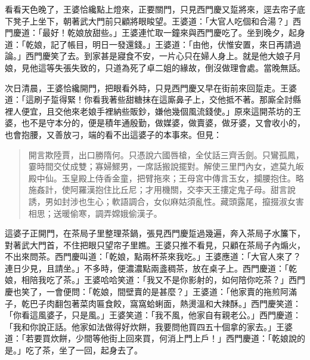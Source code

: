 看看天色晚了，王婆恰纔點上燈來，正要關門，只見西門慶又踅將來，逕去帘子底下凳子上坐下，朝著武大門前只顧將眼睃望。王婆道：「大官人吃個和合湯？」西門慶道：「最好！乾娘放甜些。」王婆連忙取一鐘來與西門慶吃了。坐到晚夕，起身道：「乾娘，記了帳目，明日一發還錢。」王婆道：「由他，伏惟安置，來日再請過論。」西門慶笑了去。到家甚是寢食不安，一片心只在婦人身上。就是他大娘子月娘，見他這等失張失致的，只道為死了卓二姐的緣故，倒沒做理會處。當晚無話。

次日清晨，王婆恰纔開門，把眼看外時，只見西門慶又早在街前來回踅走。王婆道：「這刷子踅得緊！你看我著些甜糖抹在這廝鼻子上，交他抵不著。那廝全討縣裡人便宜，且交他來老娘手裡納些販鈔，嫌他幾個風流錢使。」原來這開茶坊的王婆，也不是守本分的，便是積年通殷勤，做媒婆，做賣婆，做牙婆，又會收小的，也會抱腰，又善放刁，端的看不出這婆子的本事來。但見：
\begin{quote}
開言欺陸賈，出口勝隋何。只憑說六國唇槍，全仗話三齊舌劍。只鸞孤鳳，霎時間交仗成雙；寡婦鰥男，一席話搬說擺對。解使三里門內女，遮莫九皈殿中仙。玉皇殿上侍香金童，把臂拖來；王母宮中傳言玉女，攔腰抱住。略施姦計，使阿羅漢抱住比丘尼；才用機關，交李天王摟定鬼子母。甜言說誘，男如封涉也生心；軟語調合，女似麻姑須亂性。藏頭露尾，攛掇淑女害相思；送暖偷寒，調弄嫦娥偷漢子。
\end{quote}

這婆子正開門，在茶局子里整理茶鍋，張見西門慶踅過幾遍，奔入茶局子水簾下，對著武大門首，不住把眼只望帘子里瞧。王婆只推不看見，只顧在茶局子內煽火，不出來問茶。西門慶叫道：「乾娘，點兩杯茶來我吃。」王婆應道：「大官人來了？連日少見，且請坐。」不多時，便濃濃點兩盞稠茶，放在桌子上。西門慶道：「乾娘，相陪我吃了茶。」王婆哈哈笑道：「我又不是你影射的，如何陪你吃茶？」西門慶也笑了，一會便問：「乾娘，間壁賣的是甚麼？」王婆道：「他家賣的拖煎阿滿子，乾巴子肉翻包著菜肉匾食餃，窩窩蛤蜊面，熱燙溫和大辣酥。」西門慶笑道：「你看這風婆子，只是風。」王婆笑道：「我不風，他家自有親老公。」西門慶道：「我和你說正話。他家如法做得好炊餅，我要問他買四五十個拿的家去。」王婆道：「若要買炊餅，少間等他街上回來買，何消上門上戶！」西門慶道：「乾娘說的是。」吃了茶，坐了一回，起身去了。

